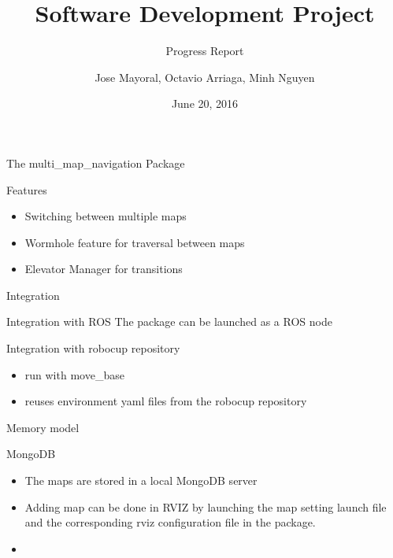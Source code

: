 \documentclass[14pt]{beamer}
\title{Software Development Project}
\subtitle{Progress Report}
\date{June 20, 2016}
\author{Jose Mayoral, Octavio Arriaga, Minh Nguyen}
\begin{document}
\maketitle

\begin{frame}{The multi\_map\_navigation Package}
    \begin{alertblock}{Features}
        \begin{itemize}
            \item Switching between multiple maps
            \item Wormhole feature for traversal between maps
            \item Elevator Manager for transitions
        \end{itemize}
    \end{alertblock}
\end{frame}

\begin{frame}{Integration}
    \begin{alertblock}{Integration with ROS}
        The package can be launched as a ROS node
    \end{alertblock}
    \begin{alertblock}{Integration with robocup repository}
    \begin{itemize}
        \item run with move\_base
        \item reuses environment yaml files from the robocup repository
    \end{itemize}
    \end{alertblock}
\end{frame}

\begin{frame}{Memory model}
    \begin{alertblock}{MongoDB}
        \begin{itemize}
            \item The maps are stored in a local MongoDB server
            \item Adding map can be done in RVIZ by launching the map setting launch file and the corresponding rviz configuration file in the package.
            \item 
        \end{itemize}
    \end{alertblock}
\end{frame}
\end{document}
